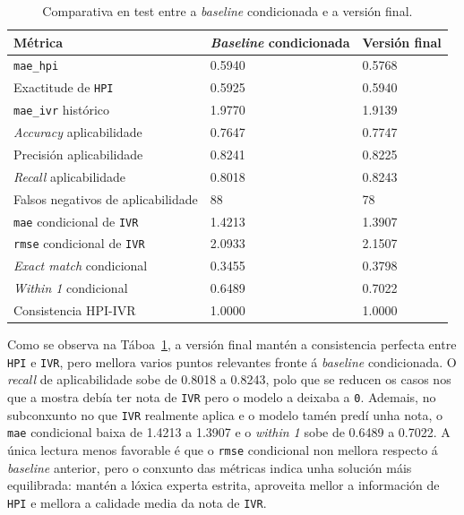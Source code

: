 {
\begin{table}[htbp]
    \centering
    \footnotesize
    \setlength{\tabcolsep}{4pt}
    \begin{tabular}{p{}|p{}|p{}}
        \rowcolor{udcpink!25}
        \textbf{Métrica} & \textbf{\textit{Baseline} condicionada} & \textbf{Versión final} \\\hline
        \texttt{mae\_hpi} & 0.5940 & 0.5768 \\
        Exactitude de \texttt{HPI} & 0.5925 & 0.5940 \\
        \texttt{mae\_ivr} histórico & 1.9770 & 1.9139 \\
        \textit{Accuracy} aplicabilidade & 0.7647 & 0.7747 \\
        Precisión aplicabilidade & 0.8241 & 0.8225 \\
        \textit{Recall} aplicabilidade & 0.8018 & 0.8243 \\
        Falsos negativos de aplicabilidade & 88 & 78 \\
        \texttt{mae} condicional de \texttt{IVR} & 1.4213 & 1.3907 \\
        \texttt{rmse} condicional de \texttt{IVR} & 2.0933 & 2.1507 \\
        \textit{Exact match} condicional & 0.3455 & 0.3798 \\
        \textit{Within 1} condicional & 0.6489 & 0.7022 \\
        Consistencia HPI-IVR & 1.0000 & 1.0000 \\
    \end{tabular}
    \caption{Comparativa en test entre a \textit{baseline} condicionada e a versión final.}
    \label{tab:comparativa-version-final}
\end{table}
}

Como se observa na Táboa~\ref{tab:comparativa-version-final}, a versión final mantén a consistencia
perfecta entre \texttt{HPI} e \texttt{IVR}, pero mellora varios puntos relevantes fronte á
\textit{baseline} condicionada. O \textit{recall} de aplicabilidade sobe de 0.8018 a 0.8243, polo que
se reducen os casos nos que a mostra debía ter nota de \texttt{IVR} pero o modelo a deixaba a
\texttt{0}. Ademais, no subconxunto no que \texttt{IVR} realmente aplica e o modelo tamén predí unha
nota, o \texttt{mae} condicional baixa de 1.4213 a 1.3907 e o \textit{within 1} sobe de 0.6489 a
0.7022. A única lectura menos favorable é que o \texttt{rmse} condicional non mellora respecto á
\textit{baseline} anterior, pero o conxunto das métricas indica unha solución máis equilibrada:
mantén a lóxica experta estrita, aproveita mellor a información de \texttt{HPI} e mellora a calidade
media da nota de \texttt{IVR}.


